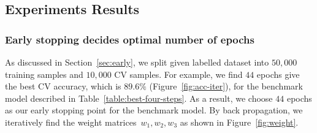 \subsection{Experiments Results}
\subsubsection{Early stopping decides optimal number of epochs}
As discussed in Section~\ref{sec:early}, we split given labelled dataset into $50,000$ training samples and $10,000$ CV samples. For example, we find $44$ epochs give the best CV accuracy, which is $89.6\%$ (Figure~\ref{fig:acc-iter}), for the benchmark model described in Table~\ref{table:best-four-steps}. As a result, we choose $44$ epochs as our early stopping point for the benchmark model. By back propagation, we iteratively find the weight matrices~$w_1,w_2,w_3$ as shown in Figure~\ref{fig:weight}.

